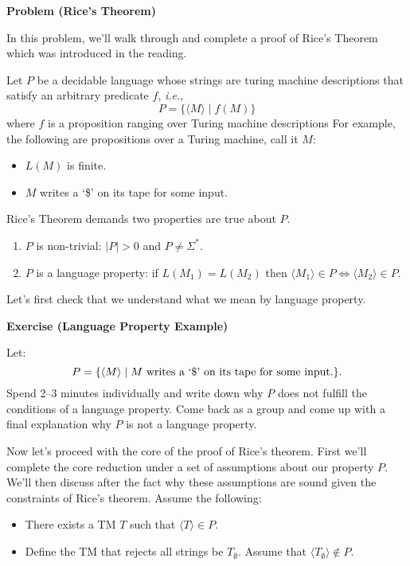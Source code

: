 \documentclass[12pt]{article}
\newcommand{\ie}{\emph{i.e.}\xspace}
\newenvironment{exercise}[1]{%
  \begin{shaded}
  \noindent\textbf{Exercise (#1)}\quad
}{\end{shaded}}
\newcounter{ProblemCounter}
\newenvironment{problem}[1][]
  {\refstepcounter{ProblemCounter}\noindent\textbf{Problem \theProblemCounter{} (#1)}\quad}
  {\newpage}
\newcommand{\desc}[1]{\ensuremath{\langle #1 \rangle}}
\begin{document}
\begin{problem}[Rice's Theorem]

In this problem, we'll walk through and complete a proof of Rice's Theorem
which was introduced in the reading.

Let \( P \)  be a decidable language whose strings are turing machine
descriptions that satisfy an arbitrary predicate \( f \), \ie,
\[
  P = \{ \desc{M} \mid f(M) \}
\]
where \( f \) is a proposition ranging over Turing machine descriptions  For
example, the following are propositions over a Turing machine, call it \( M \):
\begin{itemize}
  \item \( L(M) \) is finite.
  \item \( M \) writes a `\$' on its tape for some input.
\end{itemize}

Rice's Theorem demands two properties are true about \( P \).
\begin{enumerate}
  \item \( P \) is non-trivial: \( |P| > 0 \) and \( P \neq \Sigma^* \).
  \item \( P \) is a language property: if \( L(M_1) = L(M_2) \) then \(
    \desc{M_1} \in P \Leftrightarrow \desc{M_2} \in P \).
\end{enumerate}

Let's first check that we understand what we mean by language property.

\begin{exercise}{Language Property Example}
  Let:
  \[
    P = \{ \desc{M} \mid \text{\( M \) writes a `\$' on its tape for some
    input.} \}.
  \]
  Spend 2--3 minutes individually and write down why \( P \) does not fulfill
  the conditions of a language property.  Come back as a group and come up with
  a final explanation why \( P \) is not a language property.
\end{exercise}

Now let's proceed with the core of the proof of Rice's theorem.  First we'll
complete the core reduction under a set of assumptions about our property \( P
\).  We'll then discuss after the fact why these assumptions are sound given the
constraints of Rice's theorem.  Assume the following:

\begin{itemize}
  \item There exists a TM \( T \) such that \( \desc{T} \in P \).
  \item Define the TM that rejects all strings be \( T_{\emptyset} \).
    Assume that \( \desc{T_{\emptyset}} \not\in P \).
\end{itemize}


\end{problem}
\end{document}
